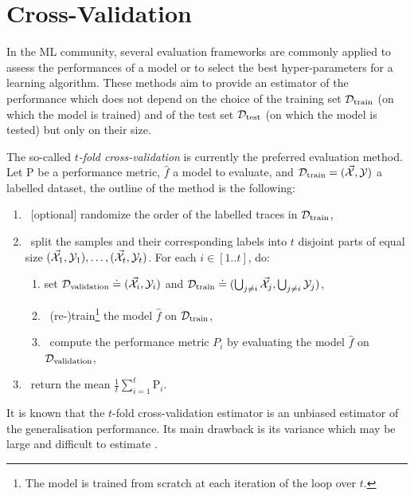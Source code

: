 \chapter{Cross-Validation} 

\label{app:cross-validation} 

In the ML community, several evaluation frameworks are commonly
applied to assess the performances of a model or to select the best hyper-parameters
for a learning algorithm. These methods aim to provide an
estimator of the performance which does not
depend on the choice of the training set $\mathcal{D}_{\text{train}}$ (on which the model is trained) and of the
test set $\mathcal{D}_{\text{test}}$ (on which the model is tested) but only on their size.

The so-called \emph{$t$-fold
cross-validation} \cite{friedman2001elements} is currently the preferred evaluation method. Let P be a
performance metric, $\hat{f}$ a model to evaluate, and $\mathcal{D}_{\text{train}}=(\vec{\mathcal{X}}, \mathcal{Y})$ a labelled dataset, the outline of the method is the
following: 
\begin{enumerate}
\item ~[optional] randomize the order of the labelled traces in $\mathcal{D}_{\text{train}}$, 
\item ~split the samples and their corresponding labels into $t$ disjoint parts
of equal size $(\vec{\mathcal{X}}_1,\mathcal{Y}_1),\ldots,(\vec{\mathcal{X}}_t,\mathcal{Y}_t)$.
For each $i\in [1..t]$, do:
\begin{enumerate}
\item set $\mathcal{D}_{\text{validation}} \doteq (\vec{\mathcal{X}}_i, \mathcal{Y}_i)$ and
$\mathcal{D}_{\text{train}} \doteq (\bigcup_{j\neq i} \vec{\mathcal{X}}_j, \bigcup_{j\neq
i} \mathcal{Y}_j)$,
\item ~(re-)train\footnote{The model is trained from scratch at each iteration of the loop over $t$.} the model $\hat{f}$ on $\mathcal{D}_{\text{train}}$, 
\item ~compute the performance metric $P_i$ by evaluating the model $\hat{f}$ on $\mathcal{D}_{\text{validation}}$,
\end{enumerate}
\item ~return the mean $\frac{1}{t}\sum_{i=1}^t \text{P}_i$.
\end{enumerate}

It is known that the $t$-fold cross-validation estimator is an unbiased
estimator of the generalisation performance. Its main drawback is its variance
which may be large and difficult to estimate
\cite{breiman1996heuristics,bengio2005bias}. 